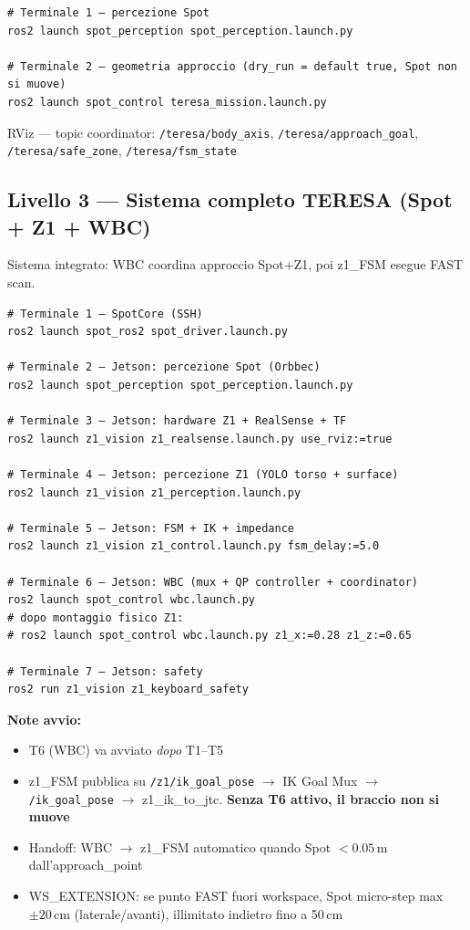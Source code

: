 \documentclass[a4paper,11pt]{article}
\begin{document}
\begin{lstlisting}
# Terminale 1 — percezione Spot
ros2 launch spot_perception spot_perception.launch.py

# Terminale 2 — geometria approccio (dry_run = default true, Spot non si muove)
ros2 launch spot_control teresa_mission.launch.py
\end{lstlisting}

RViz — topic coordinator: \texttt{/teresa/body\_axis}, \texttt{/teresa/approach\_goal},
\texttt{/teresa/safe\_zone}, \texttt{/teresa/fsm\_state}

\subsection*{Livello 3 — Sistema completo TERESA (Spot + Z1 + WBC)}
Sistema integrato: WBC coordina approccio Spot+Z1, poi z1\_FSM esegue FAST scan.

\begin{lstlisting}
# Terminale 1 — SpotCore (SSH)
ros2 launch spot_ros2 spot_driver.launch.py

# Terminale 2 — Jetson: percezione Spot (Orbbec)
ros2 launch spot_perception spot_perception.launch.py

# Terminale 3 — Jetson: hardware Z1 + RealSense + TF
ros2 launch z1_vision z1_realsense.launch.py use_rviz:=true

# Terminale 4 — Jetson: percezione Z1 (YOLO torso + surface)
ros2 launch z1_vision z1_perception.launch.py

# Terminale 5 — Jetson: FSM + IK + impedance
ros2 launch z1_vision z1_control.launch.py fsm_delay:=5.0

# Terminale 6 — Jetson: WBC (mux + QP controller + coordinator)
ros2 launch spot_control wbc.launch.py
# dopo montaggio fisico Z1:
# ros2 launch spot_control wbc.launch.py z1_x:=0.28 z1_z:=0.65

# Terminale 7 — Jetson: safety
ros2 run z1_vision z1_keyboard_safety
\end{lstlisting}

\textbf{Note avvio:}
\begin{itemize}[leftmargin=1.5em]
  \item T6 (WBC) va avviato \emph{dopo} T1--T5
  \item z1\_FSM pubblica su \texttt{/z1/ik\_goal\_pose} $\to$ IK Goal Mux $\to$ \texttt{/ik\_goal\_pose} $\to$ z1\_ik\_to\_jtc.
        \textbf{Senza T6 attivo, il braccio non si muove}
  \item Handoff: WBC $\to$ z1\_FSM automatico quando Spot $<0.05$\,m dall'approach\_point
  \item WS\_EXTENSION: se punto FAST fuori workspace, Spot micro-step max $\pm20$\,cm (laterale/avanti), illimitato indietro fino a 50\,cm
\end{itemize}
\end{document}
